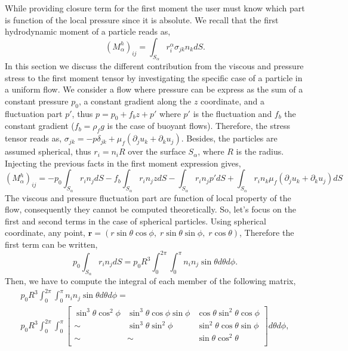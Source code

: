 While providing closure term for the first moment the user must know which part is function of the local pressure since it is absolute. 
We recall that the first hydrodynamic moment of a particle reads as,
\begin{equation}
    (M^h_\alpha)_{ij} 
    = \int_{S_\alpha} r^\alpha_i \sigma_{jk} n_k dS.
\end{equation}
In this section we discuss the different contribution from the viscous and pressure stress to the first moment tensor by investigating the specific case of a particle in a uniform flow. 
We consider a flow where pressure can be express as the sum of a constant pressure $p_0$, a constant gradient along the $z$ coordinate, and a fluctuation part $p'$, thus $p =p_0 + f_b z + p'$ where $p'$ is the fluctuation and $f_b$ the constant gradient ($f_b = \rho_f g$ is the case of buoyant flows). 
Therefore, the stress tensor reads as, $\sigma_{jk} = -p \delta_{jk} + \mu_f (\partial_j u_k+\partial_k u_j)$.
Besides, the particles are assumed spherical, thus $r_i = n_i R$ over the surface $S_\alpha$, where $R$ is the radius. 
Injecting the previous facts in the first moment expression gives,
\begin{equation}
    (M^h_\alpha)_{ij} 
    = - p_0 \int_{S_\alpha} r_i n_j dS
    - f_b \int_{S_\alpha} r_i n_j z dS
    - \int_{S_\alpha} r_i n_j p' dS
    + \int_{S_\alpha} r_i n_k \mu_f (\partial_j u_k+\partial_k u_j) dS
    \label{eq:Fistmomentdec}
\end{equation}
The viscous and pressure fluctuation part are function of local property of the flow, 
consequently they cannot be computed theoretically. 
So, let's focus on the first and second terms in the case of spherical particles. 
Using spherical coordinate, any point, $\bm{r} = (r\sin\theta \cos\phi,\; r\sin\theta \sin\phi,\; r\cos\theta )$,
Therefore the first term can be written, 
\begin{equation}
    p_0 \int_{S_\alpha} r_i n_j dS
    = p_0 R^3 \int_{0}^{2\pi}\int_{0}^\pi n_i n_j \sin\theta d\theta d\phi.
\end{equation}
Then, we have to compute the integral of each member of the following matrix,
\begin{multline}
    p_0 R^3 \int_{0}^{2\pi}\int_{0}^\pi n_i n_j \sin\theta d\theta d\phi
    =\\
     p_0 R^3 \int_{0}^{2\pi}\int_{0}^\pi
    \left[
        \begin{matrix}
            \sin^3\theta \cos^2\phi & \sin^3\theta  \cos\phi \sin\phi
            &\cos\theta\sin^2\theta \cos\phi\\
            \sim& \sin^3\theta \sin^2\phi & \sin^2\theta \cos\theta\sin\phi \\
            \sim& \sim & \sin\theta \cos^2\theta \\
        \end{matrix}
    \right]
    d\theta d\phi,
\end{multline}
